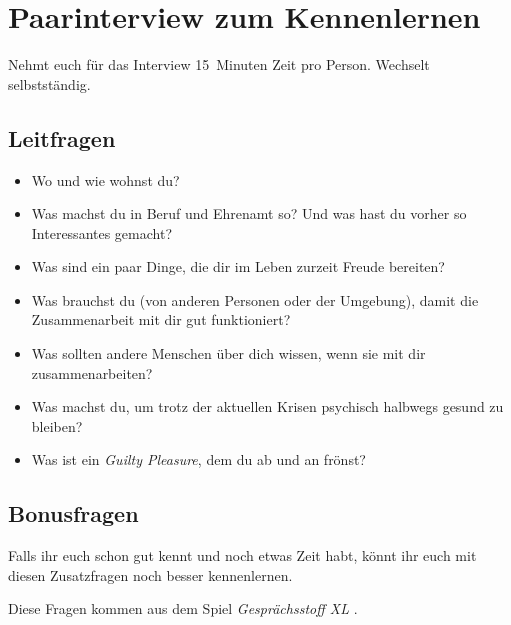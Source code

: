 \section{Paarinterview zum Kennenlernen}
\label{paarinterview}

Nehmt euch für das Interview 15~Minuten Zeit pro Person. Wechselt selbstständig.

\subsection{Leitfragen}

\begin{itemize}
 \item Wo und wie wohnst du?
 \item Was machst du in Beruf und Ehrenamt so? Und was hast du vorher so Interessantes gemacht?
 \item Was sind ein paar Dinge, die dir im Leben zurzeit Freude bereiten?
 \item Was brauchst du (von anderen Personen oder der Umgebung), damit die Zusammenarbeit mit dir gut funktioniert?
 \item Was sollten andere Menschen über dich wissen, wenn sie mit dir zusammenarbeiten?
 \item Was machst du, um trotz der aktuellen Krisen psychisch halbwegs gesund zu bleiben?
 \item Was ist ein \emph{Guilty Pleasure}, dem du ab und an frönst?
\end{itemize}


\subsection{Bonusfragen}

Falls ihr euch schon gut kennt und noch etwas Zeit habt, könnt ihr euch mit diesen Zusatzfragen noch besser kennenlernen.

Diese Fragen kommen aus dem Spiel \emph{Gesprächsstoff XL} \cite{gespraechsstoff}.


